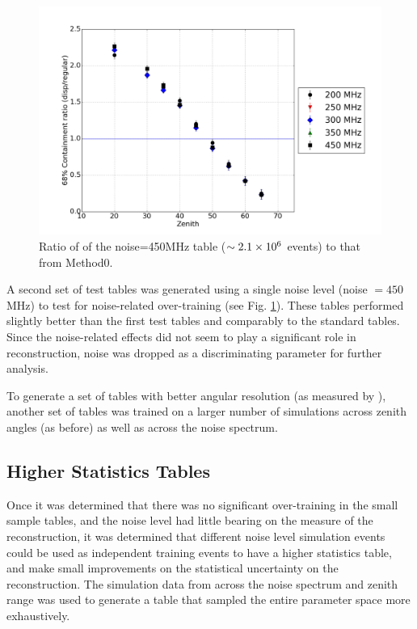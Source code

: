 \documentclass[main.tex]{subfiles}
\begin{document}
\begin{figure}[htbp]
  \centering
  \includegraphics[width=0.8\linewidth]{images/disp_450_ratio_xzen}
  \caption[\disp table reconstruction vs noise.]{Ratio of \rse of the noise=450MHz \disp table ($\sim 2.1\times 10^{6}$ events) to that from Method0.}
  \label{fig:disp_ratio_450}
\end{figure}

A second set of test \disp tables was generated using a single noise level (noise $= 450$ MHz) to test for noise-related over-training (see Fig. \ref{fig:disp_ratio_450}). These tables performed slightly better than the first test tables and comparably to the standard \disp tables. Since the noise-related effects did not seem to play a significant role in reconstruction, noise was dropped as a discriminating parameter for further analysis.

To generate a set of \disp tables with better angular resolution (as measured by \rse), another set of \disp tables was trained on a larger number of simulations across zenith angles (as before) as well as across the noise spectrum.

\subsection{Higher Statistics Tables}
Once it was determined that there was no significant over-training in the small sample \disp tables, and the noise level had little bearing on the \rse measure of the reconstruction, it was determined that different noise level simulation events could be used as independent training events to have a higher statistics \disp table, and make small improvements on the statistical uncertainty on the reconstruction. The simulation data from across the noise spectrum and zenith range was used to generate a \disp table that sampled the entire parameter space more exhaustively.
\end{document}
